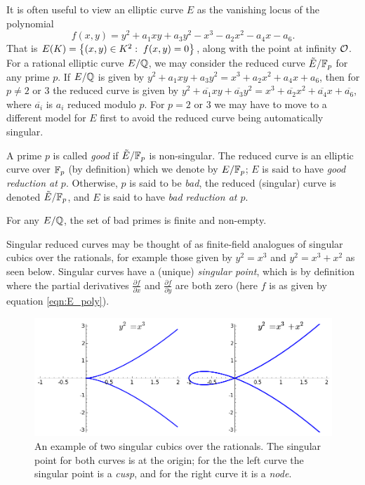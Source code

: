 \documentclass[10pt]{article}
\begin{document}
It is often useful to view an elliptic curve $E$ as the vanishing locus of the polynomial
\begin{equation}\label{eqn:E_poly}
f(x,y) = y^2 + a_1 xy + a_3 y^2 - x^3 - a_2 x^2 - a_4 x - a_6.
\end{equation}
 That is $E(K) = \left\{(x,y) \in K^2: \; f(x,y) = 0\right\}$, along with the point at infinity $\mathcal{O}$. \\

For a rational elliptic curve $E/\mathbb{Q}$, we may consider the reduced curve $\tilde{E}/\mathbb{F}_p$ for any prime $p$. If $E/\mathbb{Q}$ is given by $y^2 + a_1 xy + a_3 y^2 = x^3 + a_2 x^2 + a_4 x + a_6$, then for $p\ne 2$ or $3$ the reduced curve is given by $y^2 + \overline{a_1} xy + \overline{a_3} y^2 = x^3 + \overline{a_2} x^2 + \overline{a_4} x + \overline{a_6}$, where $\overline{a_i}$ is $a_i$ reduced modulo $p$. For $p = 2$ or $3$ we may have to move to a different model for $E$ first to avoid the reduced curve being automatically singular.

\begin{definition}
A prime $p$ is called {\it good} if $\tilde{E}/\mathbb{F}_p$ is non-singular. The reduced curve is an elliptic curve over $\mathbb{F}_p$ (by definition) which we denote by $E/\mathbb{F}_p$; $E$ is said to have {\it good reduction at $p$}. Otherwise, $p$ is said to be {\it bad}, the reduced (singular) curve is denoted $\tilde{E}/\mathbb{F}_p$, and $E$ is said to have {\it bad reduction at $p$}.
\end{definition}

\begin{theorem}
For any $E/\mathbb{Q}$, the set of bad primes is finite and non-empty.
\end{theorem}

Singular reduced curves may be thought of as finite-field analogues of singular cubics over the rationals, for example those given by $y^2 = x^3$ and $y^2 = x^3+x^2$ as seen below. Singular curves have a (unique) {\it singular point}, which is by definition where the partial derivatives $\frac{\partial f}{\partial x}$ and $\frac{\partial f}{\partial y}$ are both zero (here $f$ is as given by equation \ref{eqn:E_poly}).

\begin{figure}[!h]
    \centering
    \includegraphics[width=1.0\textwidth]{graphics/singular_cubics.png}
    \caption{An example of two singular cubics over the rationals. The singular point for both curves is at the origin; for the the left curve the singular point is a {\it cusp}, and for the right curve it is a {\it node}.}
    \label{fig:singular_cubics}
\end{figure}
\end{document}
